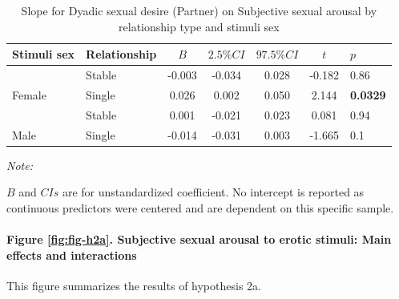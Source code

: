 \documentclass[
  bookmarksnumbered]{article}
\begin{document}
\begin{table}[H]

\caption{\label{tab:tab-m2a-slo-g}Slope for Dyadic sexual desire (Partner) on 
        Subjective sexual arousal by relationship type and stimuli sex}
\centering
\begin{threeparttable}
\begin{tabular}[t]{llccccl}
\toprule
Stimuli sex & Relationship & $B$ & $2.5\% CI$ & $97.5\% CI$ & $t$ & $p$\\
\midrule
 & Stable & -0.003 & -0.034 & 0.028 & -0.182 & 0.86\\
\cmidrule{2-7}
\multirow{-2}{*}{\raggedright\arraybackslash Female} & Single & 0.026 & 0.002 & 0.050 & 2.144 & \textbf{0.0329}\\
\cmidrule{1-7}
 & Stable & 0.001 & -0.021 & 0.023 & 0.081 & 0.94\\
\cmidrule{2-7}
\multirow{-2}{*}{\raggedright\arraybackslash Male} & Single & -0.014 & -0.031 & 0.003 & -1.665 & 0.1\\
\bottomrule
\end{tabular}
\begin{tablenotes}[para]
\item \textit{Note: } 
\item $B$ and $CIs$ are for unstandardized coefficient.
           No intercept is reported as continuous predictors were centered
           and are dependent on this specific sample.
\end{tablenotes}
\end{threeparttable}
\end{table}

\hypertarget{figure-reffigfig-h2a.-subjective-sexual-arousal-to-erotic-stimuli-main-effects-and-interactions}{%
\paragraph{Figure \ref{fig:fig-h2a}. Subjective sexual arousal to erotic stimuli: Main effects and interactions}\label{figure-reffigfig-h2a.-subjective-sexual-arousal-to-erotic-stimuli-main-effects-and-interactions}}

This figure summarizes the results of hypothesis 2a.
\end{document}
